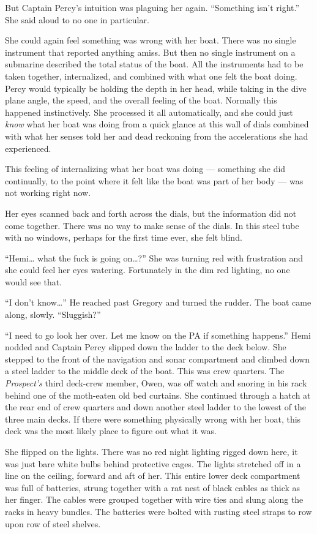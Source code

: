 \documentclass[]{article}
\begin{document}
But Captain Percy's intuition was plaguing her again. ``Something isn't
right.'' She said aloud to no one in particular.

She could again feel something was wrong with her boat. There was no
single instrument that reported anything amiss. But then no single
instrument on a submarine described the total status of the boat. All
the instruments had to be taken together, internalized, and combined
with what one felt the boat doing. Percy would typically be holding the
depth in her head, while taking in the dive plane angle, the speed, and
the overall feeling of the boat. Normally this happened instinctively.
She processed it all automatically, and she could just \emph{know} what
her boat was doing from a quick glance at this wall of dials combined
with what her senses told her and dead reckoning from the accelerations
she had experienced.

This feeling of internalizing what her boat was doing --- something she
did continually, to the point where it felt like the boat was part of
her body --- was not working right now.

Her eyes scanned back and forth across the dials, but the information
did not come together. There was no way to make sense of the dials. In
this steel tube with no windows, perhaps for the first time ever, she
felt blind.

``Hemi\ldots{} what the fuck is going on\ldots{}?'' She was turning red
with frustration and she could feel her eyes watering. Fortunately in
the dim red lighting, no one would see that.

``I don't know\ldots{}'' He reached past Gregory and turned the rudder.
The boat came along, slowly. ``Sluggish?''

``I need to go look her over. Let me know on the PA if something
happens.'' Hemi nodded and Captain Percy slipped down the ladder to the
deck below. She stepped to the front of the navigation and sonar
compartment and climbed down a steel ladder to the middle deck of the
boat. This was crew quarters. The \emph{Prospect's} third deck-crew
member, Owen, was off watch and snoring in his rack behind one of the
moth-eaten old bed curtains. She continued through a hatch at the rear
end of crew quarters and down another steel ladder to the lowest of the
three main decks. If there were something physically wrong with her
boat, this deck was the most likely place to figure out what it was.

She flipped on the lights. There was no red night lighting rigged down
here, it was just bare white bulbs behind protective cages. The lights
stretched off in a line on the ceiling, forward and aft of her. This
entire lower deck compartment was full of batteries, strung together
with a rat nest of black cables as thick as her finger. The cables were
grouped together with wire ties and slung along the racks in heavy
bundles. The batteries were bolted with rusting steel straps to row upon
row of steel shelves.
\end{document}

